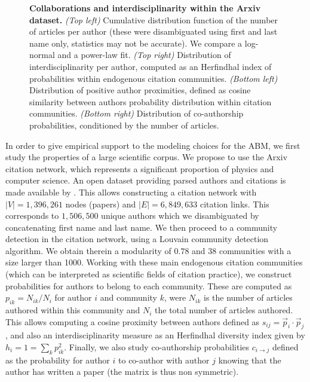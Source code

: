 \documentclass[utf8,11pt]{article}
\begin{document}
\begin{figure}
\caption{\textbf{Collaborations and interdisciplinarity within the Arxiv dataset.} \textit{(Top left)} Cumulative distribution function of the number of articles per author (these were disambiguated using first and last name only, statistics may not be accurate). We compare a log-normal and a power-law fit. \textit{(Top right)} Distribution of interdisciplinarity per author, computed as an Herfindhal index of probabilities within endogenous citation communities. \textit{(Bottom left)} Distribution of positive author proximities, defined as cosine similarity between authors probability distribution within citation communities. \textit{(Bottom right)} Distribution of co-authorship probabilities, conditioned by the number of articles.\label{fig:empirical}}
\end{figure}


In order to give empirical support to the modeling choices for the ABM, we first study the properties of a large scientific corpus. We propose to use the Arxiv citation network, which represents a significant proportion of physics and computer science. An open dataset providing parsed authors and citations is made available by \cite{clement2019use}. This allows constructing a citation network with $\left|V\right| = 1,396,261$ nodes (papers) and $\left|E\right| = 6,849,633$ citation links. This corresponds to $1,506,500$ unique authors which we disambiguated by concatenating first name and last name. We then proceed to a community detection in the citation network, using a Louvain community detection algorithm. We obtain therein a modularity of $0.78$ and 38 communities with a size larger than 1000. Working with these main endogenous citation communities (which can be interpreted as scientific fields of citation practice), we construct probabilities for authors to belong to each community. These are computed as $p_{ik} = N_{ik} / N_{i}$ for author $i$ and community $k$, were $N_{ik}$ is the number of articles authored within this community and $N_i$ the total number of articles authored. This allows computing a cosine proximity between authors defined as $s_{ij} = \vec{p}_i \cdot \vec{p}_j$, and also an interdisciplinarity measure as an Herfindhal diversity index given by $h_i = 1 = \sum_k p_{ik}^2$. Finally, we also study co-authorship probabilities $c_{i \rightarrow j}$ defined as the probability for author $i$ to co-author with author $j$ knowing that the author has written a paper (the matrix is thus non symmetric).
\end{document}

